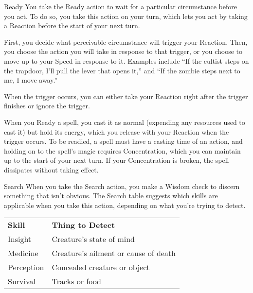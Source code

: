 \begin{Card}[Action]{Ready}
You take the Ready action to wait for a particular circumstance before you act. To do so, you take this action on your turn, which lets you act by taking a Reaction before the start of your next turn.

First, you decide what perceivable circumstance will trigger your Reaction. Then, you choose the action you will take in response to that trigger, or you choose to move up to your Speed in response to it. Examples include ``If the cultist steps on the trapdoor, I'll pull the lever that opens it,'' and ``If the zombie steps next to me, I move away.''

When the trigger occurs, you can either take your Reaction right after the trigger finishes or ignore the trigger.

When you Ready a spell, you cast it as normal (expending any resources used to cast it) but hold its energy, which you release with your Reaction when the trigger occurs. To be readied, a spell must have a casting time of an action, and holding on to the spell's magic requires Concentration, which you can maintain up to the start of your next turn. If your Concentration is broken, the spell dissipates without taking effect.
\end{Card}


\begin{Card}[Action]{Search}
When you take the Search action, you make a Wisdom check to discern something that isn't obvious. The Search table suggests which skills are applicable when you take this action, depending on what you're trying to detect.

\begin{tabular}{ll}
\textbf{Skill}  & \textbf{Thing to Detect} \\
Insight         & Creature's state of mind \\
Medicine        & Creature's ailment or cause of death \\
Perception      & Concealed creature or object \\
Survival        & Tracks or food
\end{tabular}
\end{Card}


